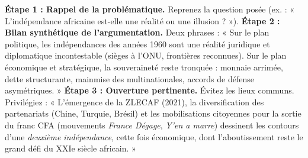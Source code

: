 \documentclass[11pt]{article}
\begin{document}
\begin{methode}
\textbf{Étape 1 : Rappel de la problématique.} Reprenez la question posée (ex. : « L'indépendance africaine est-elle une réalité ou une illusion ? »).
\textbf{Étape 2 : Bilan synthétique de l'argumentation.} Deux phrases : « Sur le plan politique, les indépendances des années 1960 sont une réalité juridique et diplomatique incontestable (sièges à l'ONU, frontières reconnues). Sur le plan économique et stratégique, la souveraineté reste tronquée : monnaie arrimée, dette structurante, mainmise des multinationales, accords de défense asymétriques. »
\textbf{Étape 3 : Ouverture pertinente.} Évitez les lieux communs. Privilégiez : « L'émergence de la ZLECAF (2021), la diversification des partenariats (Chine, Turquie, Brésil) et les mobilisations citoyennes pour la sortie du franc CFA (mouvements \emph{France Dégage}, \emph{Y'en a marre}) dessinent les contours d'une \emph{deuxième indépendance}, cette fois économique, dont l'aboutissement reste le grand défi du XXIe siècle africain. »
\end{methode}
\end{document}
